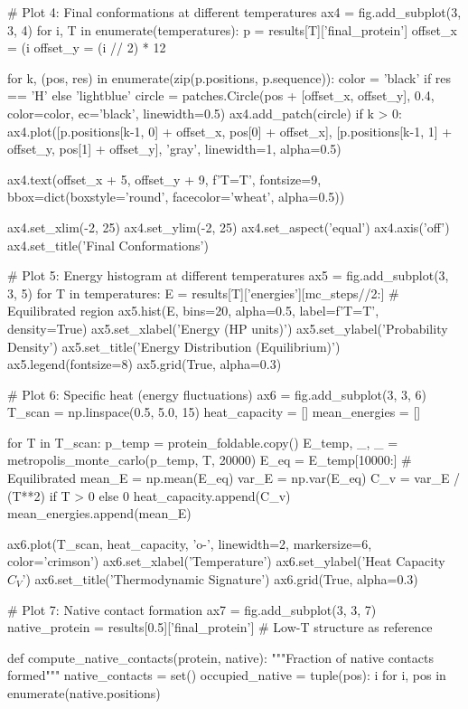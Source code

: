 \documentclass[a4paper, 11pt]{article}
\begin{document}
\begin{pycode}
# Plot 4: Final conformations at different temperatures
ax4 = fig.add_subplot(3, 3, 4)
for i, T in enumerate(temperatures):
    p = results[T]['final_protein']
    offset_x = (i %
    offset_y = (i // 2) * 12

    for k, (pos, res) in enumerate(zip(p.positions, p.sequence)):
        color = 'black' if res == 'H' else 'lightblue'
        circle = patches.Circle(pos + [offset_x, offset_y], 0.4,
                                color=color, ec='black', linewidth=0.5)
        ax4.add_patch(circle)
        if k > 0:
            ax4.plot([p.positions[k-1, 0] + offset_x, pos[0] + offset_x],
                    [p.positions[k-1, 1] + offset_y, pos[1] + offset_y],
                    'gray', linewidth=1, alpha=0.5)

    ax4.text(offset_x + 5, offset_y + 9, f'T={T}', fontsize=9,
            bbox=dict(boxstyle='round', facecolor='wheat', alpha=0.5))

ax4.set_xlim(-2, 25)
ax4.set_ylim(-2, 25)
ax4.set_aspect('equal')
ax4.axis('off')
ax4.set_title('Final Conformations')

# Plot 5: Energy histogram at different temperatures
ax5 = fig.add_subplot(3, 3, 5)
for T in temperatures:
    E = results[T]['energies'][mc_steps//2:]  # Equilibrated region
    ax5.hist(E, bins=20, alpha=0.5, label=f'T={T}', density=True)
ax5.set_xlabel('Energy (HP units)')
ax5.set_ylabel('Probability Density')
ax5.set_title('Energy Distribution (Equilibrium)')
ax5.legend(fontsize=8)
ax5.grid(True, alpha=0.3)

# Plot 6: Specific heat (energy fluctuations)
ax6 = fig.add_subplot(3, 3, 6)
T_scan = np.linspace(0.5, 5.0, 15)
heat_capacity = []
mean_energies = []

for T in T_scan:
    p_temp = protein_foldable.copy()
    E_temp, _, _ = metropolis_monte_carlo(p_temp, T, 20000)
    E_eq = E_temp[10000:]  # Equilibrated
    mean_E = np.mean(E_eq)
    var_E = np.var(E_eq)
    C_v = var_E / (T**2) if T > 0 else 0
    heat_capacity.append(C_v)
    mean_energies.append(mean_E)

ax6.plot(T_scan, heat_capacity, 'o-', linewidth=2, markersize=6, color='crimson')
ax6.set_xlabel('Temperature')
ax6.set_ylabel('Heat Capacity $C_V$')
ax6.set_title('Thermodynamic Signature')
ax6.grid(True, alpha=0.3)

# Plot 7: Native contact formation
ax7 = fig.add_subplot(3, 3, 7)
native_protein = results[0.5]['final_protein']  # Low-T structure as reference

def compute_native_contacts(protein, native):
    """Fraction of native contacts formed"""
    native_contacts = set()
    occupied_native = {tuple(pos): i for i, pos in enumerate(native.positions)}


\end{pycode}
\end{document}
